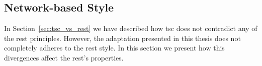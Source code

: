 


\subsection{Network-based Style} %
\label{sec:network_properties}

In Section~\ref{sec:tsc_vs_rest} we have described how \ac{tsc} does not contradict any of the \ac{rest} principles.
However, the adaptation presented in this thesis does not completely adheres to the \ac{rest} style.
In this section we present how this divergences affect the \ac{rest}'s properties.




